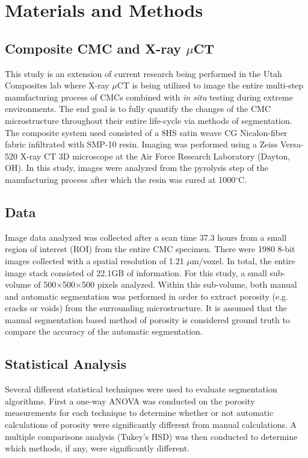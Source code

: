\documentclass[11pt, twocolumn]{article}
\begin{document}
\section{Materials and Methods}

\subsection{Composite CMC and X-ray $\mu$CT}
This study is an extension of current research being performed in the Utah Composites lab where X-ray $\mu$CT is being utilized to image the entire multi-step manufacturing process of CMCs combined with \textit{in situ} testing during extreme environments. The end goal is to fully quantify the changes of the CMC microstructure throughout their entire life-cycle via methods of segmentation. The composite system used consisted of a 8HS satin weave CG Nicalon-fiber fabric infiltrated with SMP-10 resin. Imaging was performed using a Zeiss Versa-520 X-ray CT 3D microscope at the Air Force Research Laboratory (Dayton, OH). In this study, images were analyzed from the pyrolysis step of the manufacturing process after which the resin was cured at 1000$^{\circ}$C.

\subsection{Data}
Image data analyzed was collected after a scan time 37.3 hours from a small region of interest (ROI) from the entire CMC specimen. There were 1980 8-bit images collected with a spatial resolution of 1.21 $\mu$m/voxel. In total, the entire image stack consisted of 22.1GB of information. For this study, a small sub-volume of 500$\times$500$\times$500 pixels analyzed. Within this sub-volume, both manual and automatic segmentation was performed in order to extract porosity (e.g. cracks or voids) from the surrounding microstructure. It is assumed that the manual segmentation based method of porosity is considered ground truth to compare the accuracy of the automatic segmentation.

\subsection{Statistical Analysis} 
Several different statistical techniques were used to evaluate segmentation algorithms. First a one-way ANOVA was conducted on the porosity measurements for each technique to determine whether or not automatic calculations of porosity were significantly different from manual calculations. A multiple comparisons analysis (Tukey's HSD) was then conducted to determine which methods, if any, were significantly different.\\
\end{document}
